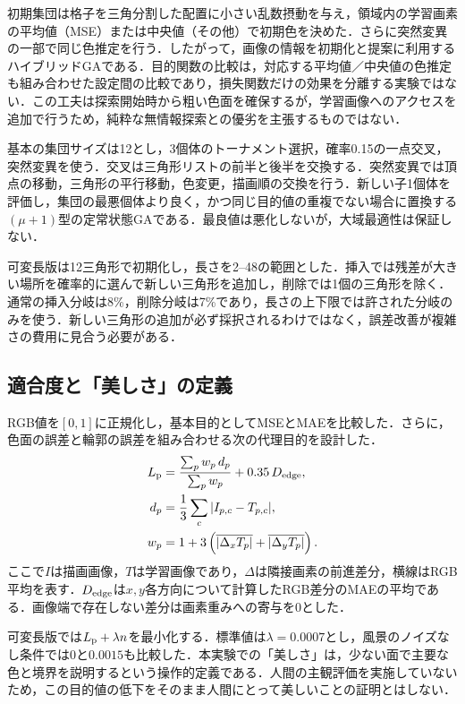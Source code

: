 初期集団は格子を三角分割した配置に小さい乱数摂動を与え，領域内の学習画素の平均値（MSE）または中央値（その他）で初期色を決めた．さらに突然変異の一部で同じ色推定を行う．したがって，画像の情報を初期化と提案に利用するハイブリッドGAである．目的関数の比較は，対応する平均値／中央値の色推定も組み合わせた設定間の比較であり，損失関数だけの効果を分離する実験ではない．この工夫は探索開始時から粗い色面を確保するが，学習画像へのアクセスを追加で行うため，純粋な無情報探索との優劣を主張するものではない．

基本の集団サイズは12とし，3個体のトーナメント選択，確率0.15の一点交叉，突然変異を使う．交叉は三角形リストの前半と後半を交換する．突然変異では頂点の移動，三角形の平行移動，色変更，描画順の交換を行う．新しい子1個体を評価し，集団の最悪個体より良く，かつ同じ目的値の重複でない場合に置換する$(\mu+1)$型の定常状態GAである．最良値は悪化しないが，大域最適性は保証しない．

可変長版は12三角形で初期化し，長さを2--48の範囲とした．挿入では残差が大きい場所を確率的に選んで新しい三角形を追加し，削除では1個の三角形を除く．通常の挿入分岐は8\%，削除分岐は7\%であり，長さの上下限では許された分岐のみを使う．新しい三角形の追加が必ず採択されるわけではなく，誤差改善が複雑さの費用に見合う必要がある．

\subsection{適合度と「美しさ」の定義}
RGB値を$[0,1]$に正規化し，基本目的としてMSEとMAEを比較した．さらに，色面の誤差と輪郭の誤差を組み合わせる次の代理目的を設計した．
\begin{align}
 L_{\rm p}&=\frac{\sum_{p}w_p\,d_p}{\sum_p w_p}
              +0.35\,D_{\rm edge},\\
 d_p&=\frac{1}{3}\sum_c |I_{p,c}-T_{p,c}|,\\
 w_p&=1+3\left(\overline{|\Delta_xT_p|}
                         +\overline{|\Delta_yT_p|}\right).
\end{align}
ここで$I$は描画画像，$T$は学習画像であり，$\Delta$は隣接画素の前進差分，横線はRGB平均を表す．$D_{\rm edge}$は$x,y$各方向について計算したRGB差分のMAEの平均である．画像端で存在しない差分は画素重みへの寄与を0とした．

可変長版では$L_{\rm p}+\lambda n$を最小化する．標準値は$\lambda=0.0007$とし，風景のノイズなし条件では$0$と$0.0015$も比較した．本実験での「美しさ」は，少ない面で主要な色と境界を説明するという操作的定義である．人間の主観評価を実施していないため，この目的値の低下をそのまま人間にとって美しいことの証明とはしない．

